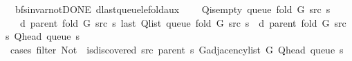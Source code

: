 \begin{isabellebody}
\begin{isamarkuptext}
{\isacharquery}{\kern0pt}s{\isacharparenright}{\kern0pt}{\isacharparenright}{\kern0pt}{\isacharparenright}{\kern0pt}{\isacharparenright}{\kern0pt}\ {\isacharplus}{\kern0pt}\ {}}.%
\end{isamarkuptext}\isamarkuptrue%
\isamarkupfalse%
\ {\isacharparenleft}{\kern0pt}\ bfs{\isacharunderscore}{\kern0pt}invar{\isacharunderscore}{\kern0pt}not{\isacharunderscore}{\kern0pt}DONE{\isacharparenright}{\kern0pt}\ d{\isacharunderscore}{\kern0pt}last{\isacharunderscore}{\kern0pt}queue{\isacharunderscore}{\kern0pt}le{\isacharunderscore}{\kern0pt}fold{\isacharunderscore}{\kern0pt}aux{\isacharcolon}{\kern0pt}\isanewline
\ \ \ {\isachardoublequoteopen}{\isasymnot}\ Q{\isacharunderscore}{\kern0pt}is{\isacharunderscore}{\kern0pt}empty\ {\isacharparenleft}{\kern0pt}queue\ {\isacharparenleft}{\kern0pt}fold\ G\ src\ s{\isacharparenright}{\kern0pt}{\isacharparenright}{\kern0pt}{\isachardoublequoteclose}\isanewline
\ \ \ {\isachardoublequoteopen}d\ {\isacharparenleft}{\kern0pt}parent\ {\isacharparenleft}{\kern0pt}fold\ G\ src\ s{\isacharparenright}{\kern0pt}{\isacharparenright}{\kern0pt}\ {\isacharparenleft}{\kern0pt}last\ {\isacharparenleft}{\kern0pt}Q{\isacharunderscore}{\kern0pt}list\ {\isacharparenleft}{\kern0pt}queue\ {\isacharparenleft}{\kern0pt}fold\ G\ src\ s{\isacharparenright}{\kern0pt}{\isacharparenright}{\kern0pt}{\isacharparenright}{\kern0pt}{\isacharparenright}{\kern0pt}\ {\isasymle}\ d\ {\isacharparenleft}{\kern0pt}parent\ {\isacharparenleft}{\kern0pt}fold\ G\ src\ s{\isacharparenright}{\kern0pt}{\isacharparenright}{\kern0pt}\ {\isacharparenleft}{\kern0pt}Q{\isacharunderscore}{\kern0pt}head\ {\isacharparenleft}{\kern0pt}queue\ s{\isacharparenright}{\kern0pt}{\isacharparenright}{\kern0pt}\ {\isacharplus}{\kern0pt}\ {}{\isachardoublequoteclose}\isanewline
%
\isadelimproof
%
\endisadelimproof
%
\isatagproof
{}\isamarkupfalse%
\ {\isacharparenleft}{\kern0pt}cases\ {\isachardoublequoteopen}filter\ {\isacharparenleft}{\kern0pt}Not\ {\isasymcirc}\ is{\isacharunderscore}{\kern0pt}discovered\ src\ {\isacharparenleft}{\kern0pt}parent\ s{\isacharparenright}{\kern0pt}{\isacharparenright}{\kern0pt}\ {\isacharparenleft}{\kern0pt}G{\isachardot}{\kern0pt}adjacency{\isacharunderscore}{\kern0pt}list\ G\ {\isacharparenleft}{\kern0pt}Q{\isacharunderscore}{\kern0pt}head\ {\isacharparenleft}{\kern0pt}queue\ s{\isacharparenright}{\kern0pt}{\isacharparenright}{\kern0pt}{\isacharparenright}{\kern0pt}\ {\isacharequal}{\kern0pt}\ {\isacharbrackleft}{\kern0pt}{\isacharbrackright}{\kern0pt}{\isachardoublequoteclose}{\isacharparenright}{\kern0pt}\isanewline

\end{isabellebody}
